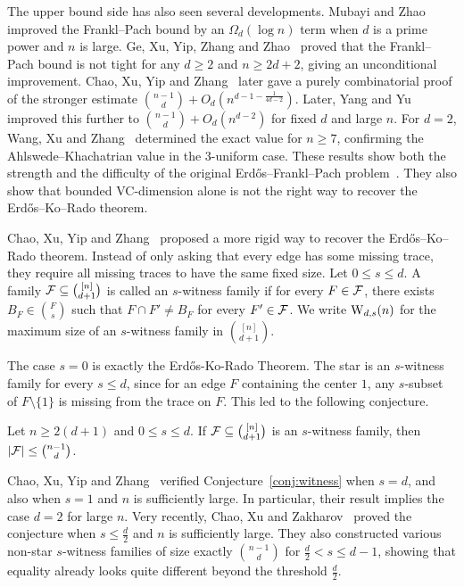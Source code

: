 The upper bound side has also seen several developments. Mubayi and Zhao~\cite{2007JAC} improved the Frankl--Pach bound by an \(\Omega_d(\log n)\) term when \(d\) is a prime power and \(n\) is large. Ge, Xu, Yip, Zhang and Zhao~\cite{2024FranklPach} proved that the Frankl--Pach bound is not tight for any \(d\ge2\) and \(n\ge 2d+2\), giving an unconditional improvement. Chao, Xu, Yip and Zhang~\cite{2025CombProof} later gave a purely combinatorial proof of the stronger estimate \(\binom{n-1}{d}+O_d(n^{d-1-\frac{1}{4d-2}})\). Later, Yang and Yu~\cite{2025YangYu} improved this further to \(\binom{n-1}{d}+O_d(n^{d-2})\) for fixed \(d\) and large \(n\). For \(d=2\), Wang, Xu and Zhang~\cite{2025ThreeUniform} determined the exact value for \(n\ge 7\), confirming the Ahlswede--Khachatrian value in the 3-uniform case. These results show both the strength and the difficulty of the original Erd\H{o}s--Frankl--Pach problem~\cite{1984Erdos,1984Franklpach}. They also show that bounded VC-dimension alone is not the right way to recover the Erd\H{o}s--Ko--Rado theorem.

Chao, Xu, Yip and Zhang~\cite{2025CombProof} proposed a more rigid way to recover the Erd\H{o}s--Ko--Rado theorem. Instead of only asking that every edge has some missing trace, they require all missing traces to have the same fixed size. Let \(0\le s\le d\). A family \(\mathcal{F}\subseteq\binom{[n]}{d+1}\) is called an \(s\)-witness family if for every \(F\in\mathcal{F}\), there exists \(B_F\in\binom{F}{s}\) such that \(F\cap F'\ne B_F\) for every \(F'\in\mathcal{F}\). We write \(\operatorname{W}_{d,s}(n)\) for the maximum size of an \(s\)-witness family in \(\binom{[n]}{d+1}\).

The case \(s=0\) is exactly the Erd\H{o}s-Ko-Rado Theorem. The star is an \(s\)-witness family for every \(s\le d\), since for an edge \(F\) containing the center \(1\), any \(s\)-subset of \(F\setminus\{1\}\) is missing from the trace on \(F\). This led to the following conjecture.

\begin{conj}\label{conj:witness}
Let \(n\ge2(d+1)\) and \(0\le s\le d\). If \(\mathcal{F}\subseteq\binom{[n]}{d+1}\) is an \(s\)-witness family, then \(|\mathcal{F}|\le\binom{n-1}{d}\).
\end{conj}

Chao, Xu, Yip and Zhang~\cite{2025CombProof} verified Conjecture~\ref{conj:witness} when \(s=d\), and also when \(s=1\) and \(n\) is sufficiently large. In particular, their result implies the case \(d=2\) for large \(n\). Very recently, Chao, Xu and Zakharov~\cite{2026Chao} proved the conjecture when \(s\le \frac{d}{2}\) and \(n\) is sufficiently large. They also constructed various non-star \(s\)-witness families of size exactly \(\binom{n-1}{d}\) for \(\frac{d}{2}<s\le d-1\), showing that equality already looks quite different beyond the threshold \(\frac{d}{2}\).


